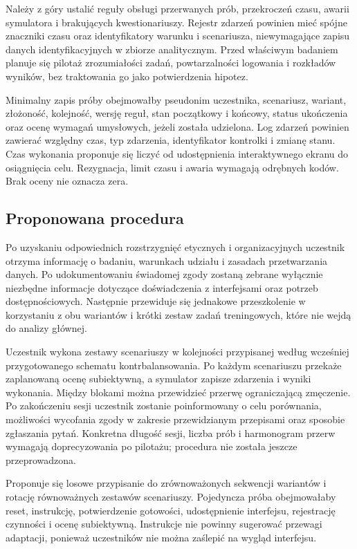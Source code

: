 \documentclass[11pt,a4paper]{article}
\begin{document}
Należy z góry ustalić reguły obsługi przerwanych prób, przekroczeń czasu, awarii symulatora i brakujących kwestionariuszy. Rejestr zdarzeń powinien mieć spójne znaczniki czasu oraz identyfikatory warunku i scenariusza, niewymagające zapisu danych identyfikacyjnych w zbiorze analitycznym. Przed właściwym badaniem planuje się pilotaż zrozumiałości zadań, powtarzalności logowania i rozkładów wyników, bez traktowania go jako potwierdzenia hipotez.

Minimalny zapis próby obejmowałby pseudonim uczestnika, scenariusz, wariant, złożoność, kolejność, wersję reguł, stan początkowy i końcowy, status ukończenia oraz ocenę wymagań umysłowych, jeżeli została udzielona. Log zdarzeń powinien zawierać względny czas, typ zdarzenia, identyfikator kontrolki i zmianę stanu. Czas wykonania proponuje się liczyć od udostępnienia interaktywnego ekranu do osiągnięcia celu. Rezygnacja, limit czasu i awaria wymagają odrębnych kodów. Brak oceny nie oznacza zera.

\subsection{Proponowana procedura}

Po uzyskaniu odpowiednich rozstrzygnięć etycznych i organizacyjnych uczestnik otrzyma informację o badaniu, warunkach udziału i zasadach przetwarzania danych. Po udokumentowaniu świadomej zgody zostaną zebrane wyłącznie niezbędne informacje dotyczące doświadczenia z interfejsami oraz potrzeb dostępnościowych. Następnie przewiduje się jednakowe przeszkolenie w korzystaniu z obu wariantów i krótki zestaw zadań treningowych, które nie wejdą do analizy głównej.

Uczestnik wykona zestawy scenariuszy w kolejności przypisanej według wcześniej przygotowanego schematu kontrbalansowania. Po każdym scenariuszu przekaże zaplanowaną ocenę subiektywną, a symulator zapisze zdarzenia i wyniki wykonania. Między blokami można przewidzieć przerwę ograniczającą zmęczenie. Po zakończeniu sesji uczestnik zostanie poinformowany o celu porównania, możliwości wycofania zgody w zakresie przewidzianym przepisami oraz sposobie zgłaszania pytań. Konkretna długość sesji, liczba prób i harmonogram przerw wymagają doprecyzowania po pilotażu; procedura nie została jeszcze przeprowadzona.

Proponuje się losowe przypisanie do zrównoważonych sekwencji wariantów i rotację równoważnych zestawów scenariuszy. Pojedyncza próba obejmowałaby reset, instrukcję, potwierdzenie gotowości, udostępnienie interfejsu, rejestrację czynności i ocenę subiektywną. Instrukcje nie powinny sugerować przewagi adaptacji, ponieważ uczestników nie można zaślepić na wygląd interfejsu.
\end{document}
